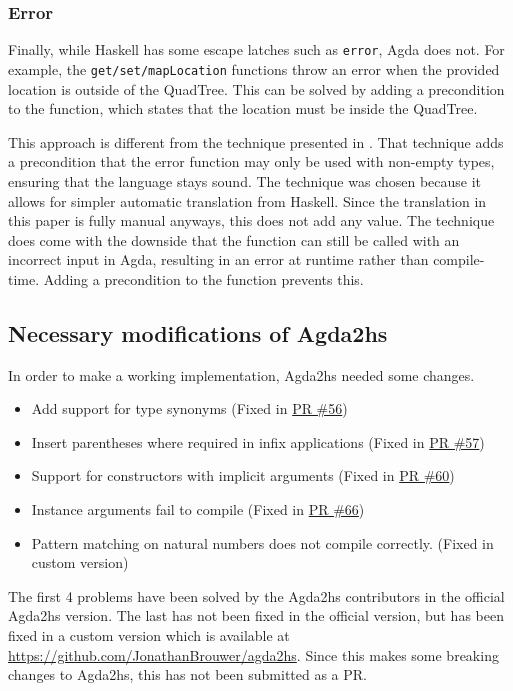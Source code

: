 \subsubsection{Error}
Finally, while Haskell has some escape latches such as \verb|error|, Agda does not. For example, the \verb|get/set/mapLocation| functions throw an error when the provided location is outside of the QuadTree. This can be solved by adding a precondition to the function, which states that the location must be inside the QuadTree. 

This approach is different from the technique presented in \cite[p. 16]{BREITNER2021}. That technique adds a precondition that the error function may only be used with non-empty types, ensuring that the language stays sound. The technique was chosen because it allows for simpler automatic translation from Haskell. Since the translation in this paper is fully manual anyways, this does not add any value. The technique does come with the downside that the function can still be called with an incorrect input in Agda, resulting in an error at runtime rather than compile-time. Adding a precondition to the function prevents this.

\subsection{Necessary modifications of Agda2hs}
In order to make a working implementation, Agda2hs needed some changes.
\begin{itemize}
    \item Add support for type synonyms (Fixed in \textcolor{blue}{\href{https://github.com/agda/agda2hs/pull/56/}{PR \#56}})
    \item Insert parentheses where required in infix applications (Fixed in  \textcolor{blue}{\href{https://github.com/agda/agda2hs/pull/57/}{PR \#57}})
    \item Support for constructors with implicit arguments (Fixed in  \textcolor{blue}{\href{https://github.com/agda/agda2hs/pull/60/}{PR \#60}})
    \item Instance arguments fail to compile (Fixed in  \textcolor{blue}{\href{https://github.com/agda/agda2hs/pull/66/}{PR \#66}})
    \item Pattern matching on natural numbers does not compile correctly. (Fixed in custom version)
\end{itemize}
The first 4 problems have been solved by the Agda2hs contributors in the official Agda2hs version. The last has not been fixed in the official version, but has been fixed in a custom version which is available at \textcolor{blue}{\href{https://github.com/JonathanBrouwer/agda2hs}{https://github.com/JonathanBrouwer/agda2hs}}. Since this makes some breaking changes to Agda2hs, this has not been submitted as a PR.
